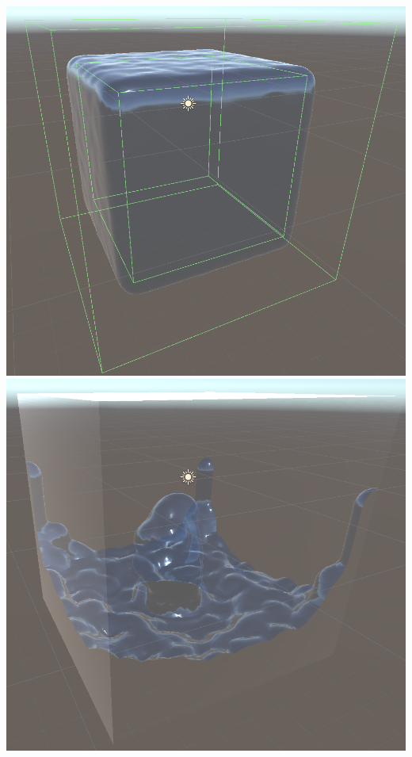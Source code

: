 \documentclass[acmtog]{acmart}
\begin{document}
\begin{center}
    \includegraphics[width=0.9\linewidth]{../Images/MarchingCube_CPU_1.PNG}
    \includegraphics[width=0.9\linewidth]{../Images/MarchingCube_CPU_2.PNG}
\end{center}
\end{document}
